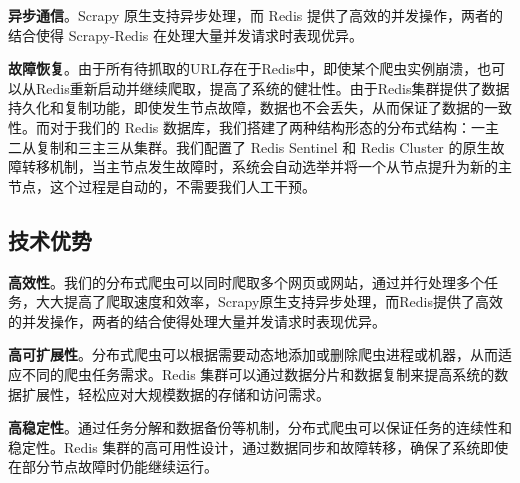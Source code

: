 \documentclass[12pt,hyperref,a4paper,UTF8]{ctexart}
\begin{document}
\textbf{异步通信}。Scrapy 原生支持异步处理，而 Redis 提供了高效的并发操作，两者的结合使得 Scrapy-Redis 在处理大量并发请求时表现优异。

\textbf{故障恢复}。由于所有待抓取的URL存在于Redis中，即使某个爬虫实例崩溃，也可以从Redis重新启动并继续爬取，提高了系统的健壮性。由于Redis集群提供了数据持久化和复制功能，即使发生节点故障，数据也不会丢失，从而保证了数据的一致性。而对于我们的 Redis 数据库，我们搭建了两种结构形态的分布式结构：一主二从复制和三主三从集群。我们配置了 Redis Sentinel 和 Redis Cluster 的原生故障转移机制，当主节点发生故障时，系统会自动选举并将一个从节点提升为新的主节点，这个过程是自动的，不需要我们人工干预。

\subsection{技术优势}

\textbf{高效性}。我们的分布式爬虫可以同时爬取多个网页或网站，通过并行处理多个任务，大大提高了爬取速度和效率，Scrapy原生支持异步处理，而Redis提供了高效的并发操作，两者的结合使得处理大量并发请求时表现优异。

\textbf{高可扩展性}。分布式爬虫可以根据需要动态地添加或删除爬虫进程或机器，从而适应不同的爬虫任务需求。Redis 集群可以通过数据分片和数据复制来提高系统的数据扩展性，轻松应对大规模数据的存储和访问需求。

\textbf{高稳定性}。通过任务分解和数据备份等机制，分布式爬虫可以保证任务的连续性和稳定性。Redis 集群的高可用性设计，通过数据同步和故障转移，确保了系统即使在部分节点故障时仍能继续运行。

\vspace{1cm}
\end{document}
